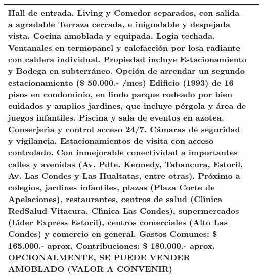 \begin{table}[H]
\begin{tabular}{|l|m{35em}|}
 Hall de entrada. Living y Comedor separados, con salida a agradable Terraza cerrada, e inigualable y despejada vista. Cocina amoblada y equipada. Logia techada. Ventanales en termopanel y calefacci\'on por losa radiante con caldera individual. Propiedad incluye Estacionamiento y Bodega en subterr\'aneo. Opci\'on de arrendar un segundo estacionamiento (\$ 50.000.- /mes)  Edificio (1993) de 16 pisos en condominio, en lindo parque rodeado por bien cuidados y amplios jardines, que incluye p\'ergola y \'area de juegos infantiles. Piscina y sala de eventos en azotea. Conserjer{\'\i}a y control acceso 24/7. C\'amaras de seguridad y vigilancia. Estacionamientos de visita con acceso controlado.  Con inmejorable conectividad a importantes calles y avenidas (Av. Pdte. Kennedy, Tabancura, Estoril, Av. Las Condes y Las Hualtatas, entre otras). Pr\'oximo a colegios, jardines infantiles, plazas (Plaza Corte de Apelaciones), restaurantes, centros de salud (Cl{\'\i}nica RedSalud Vitacura, Cl{\'\i}nica Las Condes), supermercados (L{\'\i}der Express Estoril), centros comerciales (Alto Las Condes) y comercio en general.
 Gastos Comunes: \$ 165.000.- aprox. Contribuciones: \$ 180.000.- aprox.  OPCIONALMENTE, SE PUEDE VENDER AMOBLADO (VALOR A CONVENIR) \\
\hline
\end{tabular}
\end{table}
